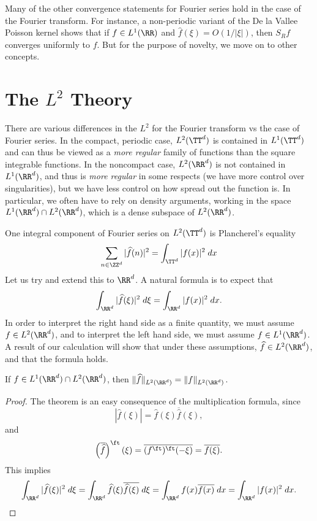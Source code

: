Many of the other convergence statements for Fourier series hold in the case of the Fourier transform. For instance, a non-periodic variant of the De la Vallee Poisson kernel shows that if $f \in L^1(\RR)$ and $\widehat{f}(\xi) = O(1/|\xi|)$, then $S_R f$ converges uniformly to $f$. But for the purpose of novelty, we move on to other concepts.

\section{The $L^2$ Theory}

There are various differences in the $L^2$ for the Fourier transform vs the case of Fourier series. In the compact, periodic case, $L^2(\TT^d)$ is contained in $L^1(\TT^d)$ and can thus be viewed as a \emph{more regular} family of functions than the square integrable functions. In the noncompact case, $L^2(\RR^d)$ is not contained in $L^1(\RR^d)$, and thus is \emph{more regular} in some respects (we have more control over singularities), but we have less control on how spread out the function is. In particular, we often have to rely on density arguments, working in the space $L^1(\RR^d) \cap L^2(\RR^d)$, which is a dense subspace of $L^2(\RR^d)$.

One integral component of Fourier series on $L^2(\TT^d)$ is Plancherel's equality
%
\[ \sum_{n \in \ZZ^d} |\widehat{f}(n)|^2 = \int_{\TT^d} |f(x)|^2\; dx \]
%
Let us try and extend this to $\RR^d$. A natural formula is to expect that
%
\[ \int_{\RR^d} |\widehat{f}(\xi)|^2\; d\xi = \int_{\RR^d} |f(x)|^2\; dx. \]
%
In order to interpret the right hand side as a finite quantity, we must assume $f \in L^2(\RR^d)$, and to interpret the left hand side, we must assume $f \in L^1(\RR^d)$. A result of our calculation will show that under these assumptions, $\widehat{f} \in L^2(\RR^d)$, and that the formula holds.

\begin{theorem}
    If $f \in L^1(\RR^d) \cap L^2(\RR^d)$, then $\| \widehat{f} \|_{L^2(\RR^d)} = \| f \|_{L^2(\RR^d)}$.
\end{theorem}
\begin{proof}
    The theorem is an easy consequence of the multiplication formula, since
    \[ |\widehat{f}(\xi)| = \widehat{f}(\xi) \overline{\widehat{f}}(\xi), \]
    and
    \[ \left( \overline{\widehat{f}} \right)^\ft(\xi) = \overline{(f^\ft)^\ft(-\xi)} = \overline{f(\xi)}. \]
    This implies
    \[ \int_{\RR^d} |\widehat{f}(\xi)|^2\; d\xi = \int_{\RR^d} \widehat{f}(\xi) \overline{\widehat{f}(\xi)}\; d\xi = \int_{\RR^d} f(x) \overline{f(x)}\; dx = \int_{\RR^d} |f(x)|^2\; dx. \qedhere \]
\end{proof}


